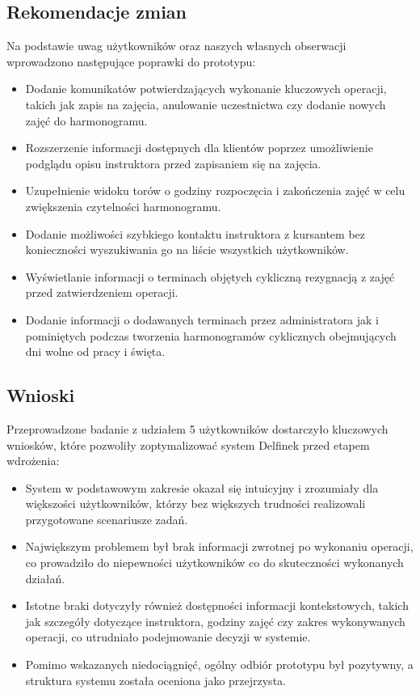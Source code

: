 \documentclass[a4paper,12pt]{article}
\begin{document}
\subsection{Rekomendacje zmian}
 
Na podstawie uwag użytkowników oraz naszych własnych obserwacji wprowadzono następujące poprawki do prototypu:
 
\begin{itemize}
    \item Dodanie komunikatów potwierdzających wykonanie kluczowych operacji, takich jak zapis na zajęcia, anulowanie uczestnictwa czy dodanie nowych zajęć do harmonogramu.
    \item Rozszerzenie informacji dostępnych dla klientów poprzez umożliwienie podglądu opisu instruktora przed zapisaniem się na zajęcia.
    \item Uzupełnienie widoku torów o godziny rozpoczęcia i zakończenia zajęć w celu zwiększenia czytelności harmonogramu.
    \item Dodanie możliwości szybkiego kontaktu instruktora z kursantem bez konieczności wyszukiwania go na liście wszystkich użytkowników.
    \item Wyświetlanie informacji o terminach objętych cykliczną rezygnacją z zajęć przed zatwierdzeniem operacji.
    \item Dodanie informacji o dodawanych terminach przez administratora jak i pominiętych podczas tworzenia harmonogramów cyklicznych obejmujących dni wolne od pracy i święta.
\end{itemize}
 
\subsection{Wnioski}
 
Przeprowadzone badanie z udziałem 5 użytkowników dostarczyło kluczowych wniosków, które pozwoliły zoptymalizować system Delfinek przed etapem wdrożenia:
 
\begin{itemize}
    \item System w podstawowym zakresie okazał się intuicyjny i zrozumiały dla większości użytkowników, którzy bez większych trudności realizowali przygotowane scenariusze zadań.
    \item Największym problemem był brak informacji zwrotnej po wykonaniu operacji, co prowadziło do niepewności użytkowników co do skuteczności wykonanych działań.
    \item Istotne braki dotyczyły również dostępności informacji kontekstowych, takich jak szczegóły dotyczące instruktora, godziny zajęć czy zakres wykonywanych operacji, co utrudniało podejmowanie decyzji w systemie.
    \item Pomimo wskazanych niedociągnięć, ogólny odbiór prototypu był pozytywny, a struktura systemu została oceniona jako przejrzysta.
\end{itemize}
\end{document}
